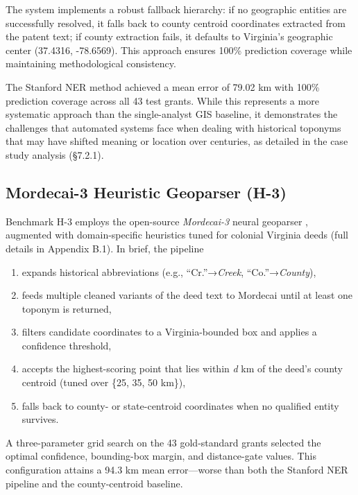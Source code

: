 The system implements a robust fallback hierarchy: if no geographic
entities are successfully resolved, it falls back to county centroid
coordinates extracted from the patent text; if county extraction fails,
it defaults to Virginia's geographic center (37.4316, -78.6569). This
approach ensures 100\% prediction coverage while maintaining
methodological consistency.

The Stanford NER method achieved a mean error of 79.02 km with 100\%
prediction coverage across all 43 test grants. While this represents a
more systematic approach than the single-analyst GIS baseline, it
demonstrates the challenges that automated systems face when dealing
with historical toponyms that may have shifted meaning or location over
centuries, as detailed in the case study analysis (§7.2.1).

\subsection{Mordecai-3 Heuristic Geoparser
(H-3)}\label{mordecai-3-heuristic-geoparser-h-3}

Benchmark H-3 employs the open-source \emph{Mordecai-3} neural geoparser
\citep{halterman2023mordecai}, augmented with domain-specific heuristics
tuned for colonial Virginia deeds (full details in Appendix B.1). In
brief, the pipeline

\begin{enumerate}
\def\labelenumi{\arabic{enumi}.}
\tightlist
\item
  expands historical abbreviations (e.g., ``Cr.''→\emph{Creek},
  ``Co.''→\emph{County}),
\item
  feeds multiple cleaned variants of the deed text to Mordecai until at
  least one toponym is returned,
\item
  filters candidate coordinates to a Virginia-bounded box and applies a
  confidence threshold,
\item
  accepts the highest-scoring point that lies within \emph{d} km of the
  deed's county centroid (tuned over \{25, 35, 50 km\}),
\item
  falls back to county- or state-centroid coordinates when no qualified
  entity survives.
\end{enumerate}

A three-parameter grid search on the 43 gold-standard grants selected
the optimal confidence, bounding-box margin, and distance-gate values.
This configuration attains a 94.3 km mean error---worse than both the
Stanford NER pipeline and the county-centroid baseline.

